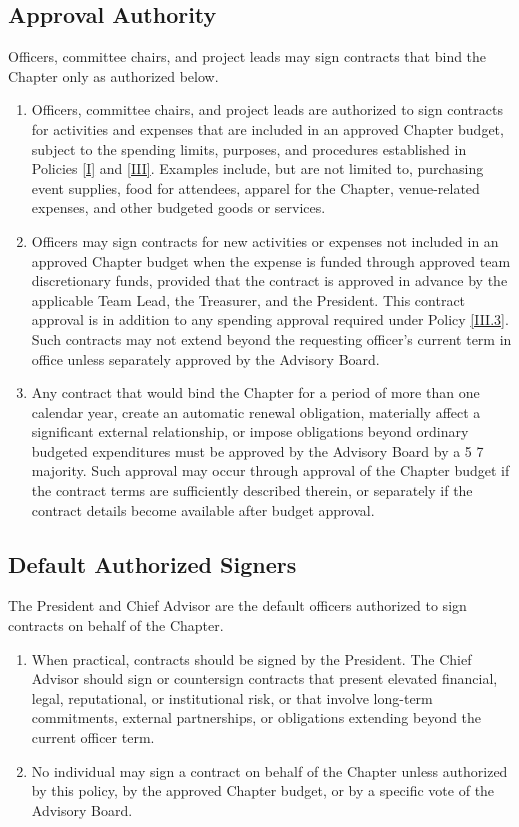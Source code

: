 \subsection{Approval Authority} \label{XIII.2}
Officers, committee chairs, and project leads may sign contracts that bind the Chapter only as authorized below.
\begin{enumerate}
    \item Officers, committee chairs, and project leads are authorized to sign contracts for activities and expenses that are included in an approved Chapter budget, 
    subject to the spending limits, purposes, and procedures established in Policies \ref{I} and \ref{III}. Examples include, but are not limited to, purchasing event supplies, 
    food for attendees, apparel for the Chapter, venue-related expenses, and other budgeted goods or services.
    \item Officers may sign contracts for new activities or expenses not included in an approved Chapter budget when the expense is funded through approved team discretionary funds, 
    provided that the contract is approved in advance by the applicable Team Lead, the Treasurer, and the President. This contract approval is in addition to any spending 
    approval required under Policy \ref{III.3}. Such contracts may not extend beyond the requesting officer’s current term in office unless separately approved by the Advisory Board.
    \item Any contract that would bind the Chapter for a period of more than one calendar year, create an automatic renewal obligation, materially affect a significant external relationship, 
    or impose obligations beyond ordinary budgeted expenditures must be approved by the Advisory Board by a 5 7 majority. Such approval may occur through approval of the 
    Chapter budget if the contract terms are sufficiently described therein, or separately if the contract details become available after budget approval.
\end{enumerate}

\subsection{Default Authorized Signers} \label{XIII.3}
The President and Chief Advisor are the default officers authorized to sign contracts on behalf of the Chapter.
\begin{enumerate}
    \item When practical, contracts should be signed by the President. The Chief Advisor should sign or countersign contracts that present elevated financial, legal, 
    reputational, or institutional risk, or that involve long-term commitments, external partnerships, or obligations extending beyond the current officer term.
    \item No individual may sign a contract on behalf of the Chapter unless authorized by this policy, by the approved Chapter budget, or by a specific vote of the Advisory Board.
\end{enumerate}

